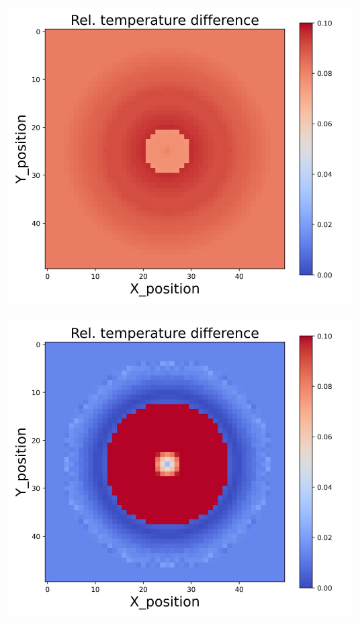 \begin{figure}[h]
\begin{minipage}{\textwidth}
\begin{subfigure}{0.3\textwidth}
            \includegraphics[width=\textwidth]{figures/raw_data/5/linear/T_bias.jpg}
        \end{subfigure}
        \begin{subfigure}{0.3\textwidth}
            \centering
            \includegraphics[width=\textwidth]{figures/raw_data/21/linear/T_bias.jpg}
        \end{subfigure}
    \end{minipage}\\

\end{figure}
